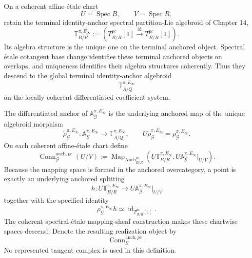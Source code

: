 \begin{construction}
\label{constr:symmetry-noether-anchor-splitting-connection-realization-and-curvature}
On a coherent affine-\'etale chart
\[
U=\operatorname{Spec}B,\qquad V=\operatorname{Spec}R,
\]
retain the terminal identity-anchor spectral partition-Lie algebroid of Chapter 14,
\[
\boxed{
\mathbb T_{B/R}^{\pi,E_\infty}
:=
\left(
T_{B/R}^{pc}[1]
\xrightarrow{\ \operatorname{id}\ }
T_{B/R}^{pc}[1]
\right).
}
\]
Its algebra structure is the unique one on the terminal anchored object.  Spectral
\'etale cotangent base change identifies these terminal anchored objects on
overlaps, and uniqueness identifies their algebra structures coherently.  Thus they
descend to the global terminal identity-anchor algebroid
\[
\mathbb T_{\overline A/Q}^{\pi,E_\infty}
\]
on the locally coherent differentiated coefficient system.

The differentiated anchor of
$\mathbb A_{\mathcal G}^{\pi,E_\infty}$ is the underlying anchored map of the
unique algebroid morphism
\[
\widetilde\rho_{\mathcal G}^{\pi,E_\infty}:
\mathbb A_{\mathcal G}^{\pi,E_\infty}
\longrightarrow
\mathbb T_{\overline A/Q}^{\pi,E_\infty},
\qquad
U\widetilde\rho_{\mathcal G}^{\pi,E_\infty}
=
\rho_{\mathcal G}^{\pi,E_\infty}.
\]
On each coherent affine-\'etale chart define
\[
\boxed{
\operatorname{Conn}_{\mathcal G}^{\mathrm{anch},pc}(U/V)
:=
\operatorname{Map}_{\operatorname{Anch}^{pc}_{B/R}}
\left(
U\mathbb T_{B/R}^{\pi,E_\infty},
U\mathbb A_{\mathcal G}^{\pi,E_\infty}|_{U/V}
\right).
}
\]
Because the mapping space is formed in the anchored overcategory, a point is
exactly an underlying anchored splitting
\[
h:
U\mathbb T_{B/R}^{\pi,E_\infty}
\longrightarrow
U\mathbb A_{\mathcal G}^{\pi,E_\infty}|_{U/V}
\]
together with the specified identity
\[
\rho_{\mathcal G}^{\pi,E_\infty}h
\simeq
\operatorname{id}_{T_{B/R}^{pc}[1]}.
\]
The coherent spectral-\'etale mapping-sheaf construction makes these chartwise
spaces descend.  Denote the resulting realization object by
\[
\boxed{
\operatorname{Conn}_{\mathcal G}^{\mathrm{anch},pc}.
}
\]
No represented tangent complex is used in this definition.
\end{construction}

